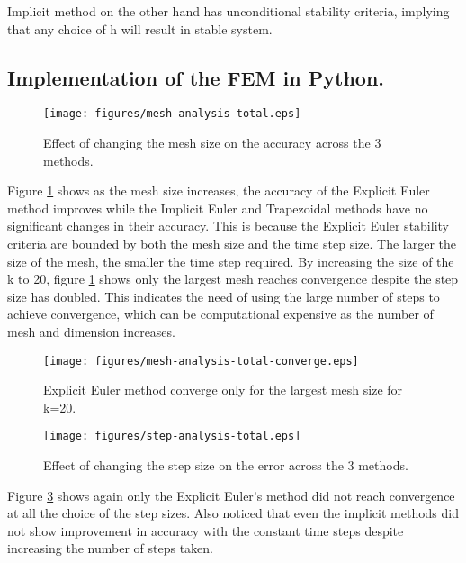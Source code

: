 \documentclass{article}
\begin{document}
Implicit method on the other hand has unconditional stability criteria, implying that any choice of h will result in stable system.







\subsection{Implementation of the FEM in Python.}%
\label{sub:Implementation of the FEM in Python.}
\begin{figure}[H]
  \centering
  \texttt{[image: figures/mesh-analysis-total.eps]}
  \caption{Effect of changing the mesh size on the accuracy across the 3 methods.}
  \label{fig:figures-mesh-analysis-total-eps}
\end{figure}

Figure \ref{fig:figures-mesh-analysis-total-eps} shows as the mesh size increases, the accuracy 
of the Explicit Euler method improves while the Implicit Euler and Trapezoidal methods have no 
significant changes in their accuracy. This is because the Explicit Euler stability criteria are
bounded by both the mesh size and the time step size. The larger the size of the mesh, the smaller the time step required. By increasing the size of the k to 20, figure \ref{fig:figures-mesh-analysis-total-eps} shows only the largest mesh reaches convergence despite the step size has doubled. This indicates the need of using  the large number of steps to achieve convergence, which
can be computational expensive as the number of mesh and dimension increases.

\begin{figure}[H]
  \centering
  \texttt{[image: figures/mesh-analysis-total-converge.eps]}
  \caption{Explicit Euler method converge only for the largest mesh size for k=20.}
  \label{fig:figures-mesh-analysis-total-converge-eps}
\end{figure}


\begin{figure}[H]
  \centering
  \texttt{[image: figures/step-analysis-total.eps]}
  \caption{Effect of changing the step size on the error across the 3 methods.}
  \label{fig:figures-step-analysis-total-eps}
\end{figure}
Figure \ref{fig:figures-step-analysis-total-eps} shows again only the Explicit Euler's method did not reach convergence at all the choice of the step sizes. Also noticed that even the implicit methods did not show improvement in accuracy with the constant time steps despite increasing the number of steps taken.
\end{document}
